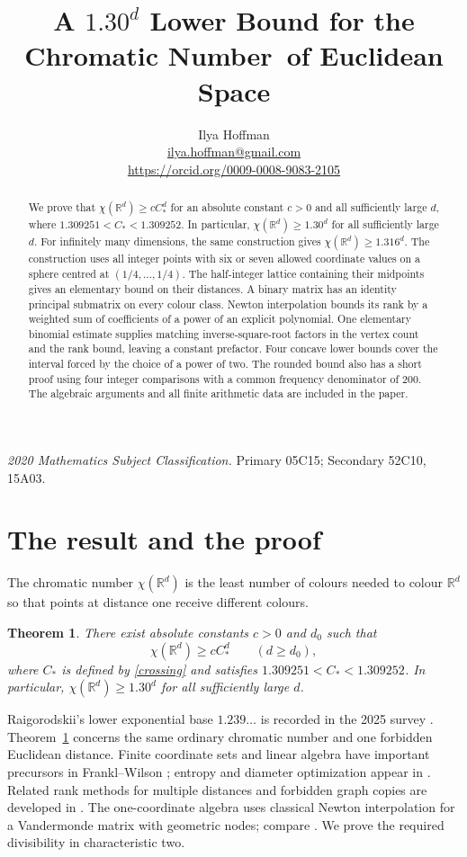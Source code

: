 \documentclass[12pt,a4paper]{article}
\title{A $1.30^d$ Lower Bound for the Chromatic Number\ of Euclidean Space}
\author{Ilya Hoffman\\[3pt]
\normalsize\href{mailto:ilya.hoffman@gmail.com}{ilya.hoffman@gmail.com}\\[2pt]
\small\href{https://orcid.org/0009-0008-9083-2105}{https://orcid.org/0009-0008-9083-2105}}
\date{}
\newtheorem{theorem}{Theorem}
\newcommand{\R}{\mathbb R}
\begin{document}
\maketitle
\vspace{-1.5em}
\begin{abstract}
We prove that $\chi(\R^d)\ge cC_*^d$ for an absolute constant $c>0$ and all sufficiently large $d$, where $1.309251<C_*<1.309252$. In particular, $\chi(\R^d)\ge1.30^d$ for all sufficiently large $d$. For infinitely many dimensions, the same construction gives $\chi(\R^d)\ge1.316^d$. The construction uses all integer points with six or seven allowed coordinate values on a sphere centred at $(1/4,\ldots,1/4)$. The half-integer lattice containing their midpoints gives an elementary bound on their distances. A binary matrix has an identity principal submatrix on every colour class. Newton interpolation bounds its rank by a weighted sum of coefficients of a power of an explicit polynomial. One elementary binomial estimate supplies matching inverse-square-root factors in the vertex count and the rank bound, leaving a constant prefactor. Four concave lower bounds cover the interval forced by the choice of a power of two. The rounded bound also has a short proof using four integer comparisons with a common frequency denominator of $200$. The algebraic arguments and all finite arithmetic data are included in the paper.
\end{abstract}
\noindent\textit{2020 Mathematics Subject Classification.} Primary 05C15; Secondary 52C10, 15A03.

\section{The result and the proof}
The chromatic number $\chi(\R^d)$ is the least number of colours needed to colour $\R^d$ so that points at distance one receive different colours.

\begin{theorem}\label{main}
There exist absolute constants $c>0$ and $d_0$ such that
\begin{equation}\label{mainbound}
\chi(\R^d)\ge cC_*^d\qquad(d\ge d_0),
\end{equation}
where $C_*$ is defined by \eqref{crossing} and satisfies
$1.309251<C_*<1.309252$. In particular, $\chi(\R^d)\ge1.30^d$ for all sufficiently large $d$.
\end{theorem}

Raigorodskii's lower exponential base $1.239\ldots$ \cite{rai} is recorded in the 2025 survey \cite[Section 1.5]{survey}. Theorem~\ref{main} concerns the same ordinary chromatic number and one forbidden Euclidean distance. Finite coordinate sets and linear algebra have important precursors in Frankl--Wilson \cite{fw}; entropy and diameter optimization appear in \cite{convex}. Related rank methods for multiple distances and forbidden graph copies are developed in \cite{kula,naslund}. The one-coordinate algebra uses classical Newton interpolation for a Vandermonde matrix with geometric nodes; compare \cite{kuznetsov}. We prove the required divisibility in characteristic two.
\end{document}
